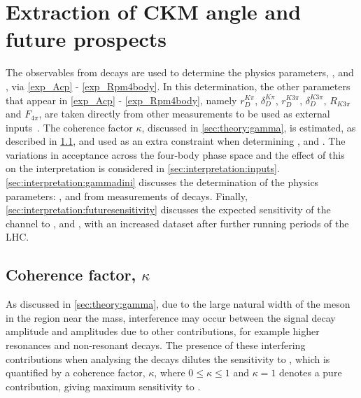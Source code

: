 \clearpage
%

\chapter{\label{ch:6-interpretation}Extraction of CKM angle \Pgamma and future prospects} 


The \CP observables from \btodkst decays are used to determine the physics parameters, \rb, \deltab and \Pgamma, via \eqns\ref{exp_Acp} - \ref{exp_Rpm4body}. In this determination, the other parameters that appear in \eqns\ref{exp_Acp} - \ref{exp_Rpm4body}, namely $r_D^{K\pi}$, $\delta_D^{K\pi}$, $r_D^{K3\pi}$, $\delta_D^{K3\pi}$, $R_{K3\pi}$ and $F_{4\pi}$, are taken directly from other measurements to be used as external inputs~\cite{HFAG,charmk3pi,charmk3pi_errata,charm4pi}. The coherence factor $\kappa$, discussed in \sect\ref{sec:theory:gamma}, is estimated, as described in \sect\ref{sec:interpretation:coherence}, and used as an extra constraint when determining \rb, \deltab and \Pgamma. The variations in acceptance across the four-body phase space and the effect of this on the interpretation is considered in \sect\ref{sec:interpretation:inputs}. \Sect\ref{sec:interpretation:gammadini} discusses the determination of the physics parameters: \rb, \deltab and \Pgamma from measurements of \btodkst decays. Finally, \sect\ref{sec:interpretation:futuresensitivity} discusses the expected sensitivity of the \btodkst channel to \rb, \deltab and \Pgamma, with an increased dataset after further running periods of the LHC.

\section{Coherence factor, $\kappa$}
\label{sec:interpretation:coherence}

As discussed in \sect\ref{sec:theory:gamma}, due to the large natural width of the \Kstarm meson in the region near the \Kstarm mass, interference may occur between the signal \Kstarm decay amplitude and amplitudes due to other \decay{\Bm}{\D\KS\pim} contributions, for example higher \KS\pim resonances and non-resonant decays. The presence of these interfering contributions when analysing the \btodkst decays dilutes the sensitivity to \Pgamma, which is quantified by a coherence factor, $\kappa$, where $0 \leq \kappa \leq 1$ and $\kappa = 1$ denotes a pure \Kstarm contribution, giving maximum sensitivity to \Pgamma. 


